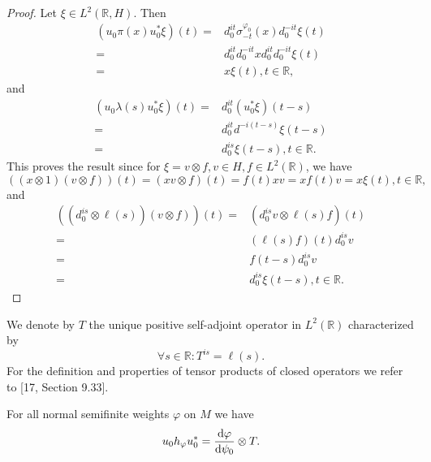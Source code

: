 \begin{proof}
    Let $\xi\in L^2(\mathbb{R},H)$. Then
    \[
        \begin{split}
            (u_0\pi(x)u_0^*\xi)(t)=&d_0^{it}\sigma_{-t}^{\varphi_0}(x)d_0^{-it}\xi(t)\\
            =&d_0^{it}d_0^{-it}xd_0^{it}d_0^{-it}\xi(t)\\
            =&x\xi(t),t\in \mathbb{R},
        \end{split}
    \]
    and
    \[
        \begin{split}
            (u_0\lambda(s)u_0^*\xi)(t)=&d_0^{it}(u_0^*\xi)(t-s)\\
            =&d_0^{it}d^{-i(t-s)}\xi(t-s)\\
            =&d_0^{is}\xi(t-s),t\in \mathbb{R}.
        \end{split}
    \]
    This proves the result since for $\xi=v\otimes f,v\in H,f\in L^2(\mathbb{R})$, we have
    \[
        ((x\otimes 1)(v\otimes f))(t)=(xv\otimes f)(t)=f(t)xv=xf(t)v=x\xi(t),t\in \mathbb{R},
    \]
    and
    \[
        \begin{split}
            ((d_0^{is}\otimes\ell(s))(v\otimes f))(t)=&(d_0^{is}v\otimes \ell(s)f)(t)\\
            =&(\ell(s)f)(t)d_0^{is}v\\
            =&f(t-s)d_0^{is}v\\
            =&d_0^{is}\xi(t-s),t\in \mathbb{R}.
        \end{split}
    \]
\end{proof}
We denote by $T$ the unique positive self-adjoint operator in $L^2(\mathbb{R})$ characterized by
\begin{equation}
    \forall s\in \mathbb{R}: T^{is}=\ell(s).
\end{equation}
For the definition and properties of tensor products of closed operators we refer to [17, Section 9.33].
\begin{proposition}\label{Chap4: Prop: 4}
    For all normal semifinite weights $\varphi$ on $M$ we have
    \begin{equation}\label{Chap4: Eqn: 9}
        u_0h_\varphi u_0^*=\dv{\varphi}{\psi_0}\otimes T.
    \end{equation}
\end{proposition}
